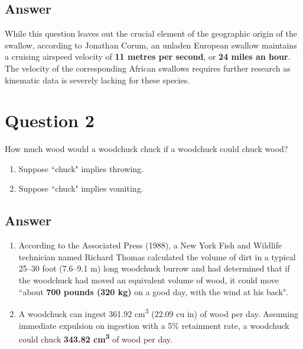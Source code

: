 \documentclass[12pt]{fphw}
\begin{document}

\subsection*{Answer}

While this question leaves out the crucial element of the geographic origin of the swallow, according to Jonathan Corum, an unladen European swallow maintains a cruising airspeed velocity of \textbf{11 metres per second}, or \textbf{24 miles an hour}. The velocity of the corresponding African swallows requires further research as kinematic data is severely lacking for these species.


\section*{Question 2}

\begin{problem}
	How much wood would a woodchuck chuck if a woodchuck could chuck wood?
	
	\medskip
	
	\begin{enumerate} %
		\item Suppose ``chuck" implies throwing.
		\item Suppose ``chuck" implies vomiting.
	\end{enumerate}
\end{problem}


\subsection*{Answer}

\begin{enumerate} %
	\item According to the Associated Press (1988), a New York Fish and Wildlife technician named Richard Thomas calculated the volume of dirt in a typical 25--30 foot (7.6--9.1 m) long woodchuck burrow and had determined that if the woodchuck had moved an equivalent volume of wood, it could move ``about \textbf{700 pounds (320 kg)} on a good day, with the wind at his back".
    
	\item A woodchuck can ingest 361.92 cm\textsuperscript{3} (22.09 cu in) of wood per day. Assuming immediate expulsion on ingestion with a 5\% retainment rate, a woodchuck could chuck \textbf{343.82 cm\textsuperscript{3}} of wood per day.
\end{enumerate}
\end{document}
